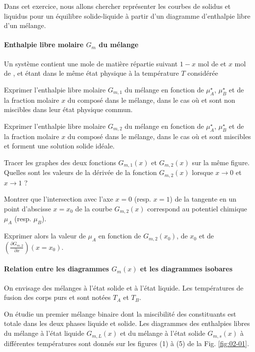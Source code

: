 
\setcounter{equation}{0}
\setcounter{Q}{0}

Dans cet exercice, nous allons chercher représenter les courbes de solidus et liquidus pour un équilibre solide-liquide à partir d'un diagramme d'enthalpie libre d'un mélange.

\paragraph*{Enthalpie libre molaire $G_m$ du mélange}

Un système contient une mole de matière répartie suivant $1-x$ \si{\mole} de  et $x$ \si{\mole} de ,  et  étant dans le même état physique à la température $T$ considérée

\Q Exprimer l'enthalpie libre molaire $G_{m,1}$ du mélange en fonction de $\mu_A^\star$, $\mu_B^\star$ et de la fraction molaire $x$ du composé  dans le mélange, dans le cas où  et  sont non miscibles dans leur état physique commun.

\Q Exprimer l'enthalpie libre molaire $G_{m,2}$ du mélange en fonction de $\mu_A^\star$, $\mu_B^\star$ et de la fraction molaire $x$ du composé  dans le mélange, dans le cas où  et  sont miscibles et forment une solution solide idéale.

\Q Tracer les graphes des deux fonctions $G_{m,1}(x)$ et $G_{m,2}(x)$ sur la même figure. Quelles sont les valeurs de la dérivée de la fonction $G_{m,2}(x)$ lorsque $x \to 0$ et $x \to 1$ ?

\Q Montrer que l'intersection avec l'axe $x=0$ (resp. $x=1$) de la tangente en un point d'abscisse $x = x_0$ de la courbe $G_{m,2}(x)$ correspond au potentiel chimique $\mu_A$ (resp. $\mu_B$).

Exprimer alors la valeur de $\mu_A$ en fonction de $G_{m,2}(x_0)$, de $x_0$ et de $\left( \frac{\partial G_{m,2}}{\partial x} \right) (x = x_0)$.

\paragraph*{Relation entre les diagrammes $G_m (x)$ et les diagrammes isobares}
On envisage des mélanges à l'état solide et à l'état liquide. Les températures de fusion des corps purs  et  sont notées $T_A$ et $T_B$.

On étudie un premier mélange binaire dont la miscibilité des constituants est totale dans les deux phases liquide et solide. Les diagrammes des enthalpies libres du mélange à l'état liquide $G_{m,L}(x)$ et du mélange à l'état solide $G_{m,s}(x)$ à différentes températures sont donnés sur les figures (1) à (5) de la Fig. \ref{fig:02-01}.

